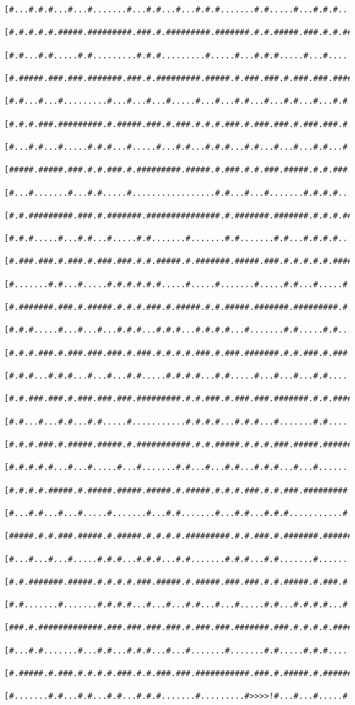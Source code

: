 \documentclass[a4paper,10pt,ngerman]{scrartcl}
\begin{document}
\begin{lstlisting}[frame=tb]
 [#...#.#.#...#...#.......#...#.#...#...#.#.#.......#.#.....#...#.#.#.........#...#]
 [#.#.#.#.#.#####.#########.###.#.#########.#######.#.#.#####.###.#.#.#######.###.#]
 [#.#...#.#.....#.#.........#.#.#.........#.....#...#.#.#.....#...#.....#.....#...#]
 [#.#####.###.###.#######.###.#.#########.#####.#.###.###.#.###.###.#####.#########]
 [#.#...#...#.........#...#...#...#.....#...#...#.#...#...#.#...#...#.#...#.......#]
 [#.#.#.###.#########.#.#####.###.#.###.#.#.#.###.#.###.###.#.###.###.#.#.#.#####.#]
 [#...#.#...#.....#.#.#...#.....#...#.#...#.#.#...#.#...#...#...#.#...#.#.#.#...#.#]
 [#####.#####.###.#.#.###.#.#########.#####.#.###.#.#.###.#####.#.#.###.###.#.#.#.#]
 [#...#.......#...#.#.....#.................#.#...#...#.......#.#.#.#...#...#.#.#.#]
 [#.#.#########.###.#.#######.###############.#.#######.#######.#.#.#.###.###.#.#.#]
 [#.#.#.....#...#.#...#.....#.#.......#.......#.#.......#.#...#.#.#.#.......#.#.#.#]
 [#.###.###.#.###.#.###.###.#.#.#####.#.#######.#####.###.#.#.#.#.#.#########.#.#.#]
 [#.......#.#...#.....#.#.#.#.#.#.....#.....#.......#.....#.#...#.....#.#.....#.#.#]
 [#.#######.###.#.#####.#.#.#.###.#.#####.#.#.#####.#######.#########.#.#.#####.#.#]
 [#.#.#.....#...#...#...#.#.#...#.#.#...#.#.#.#...#.......#.#.....#.#...#.#.......#]
 [#.#.#.###.#.###.###.###.#.###.#.#.#.#.###.#.###.#######.#.#.###.#.###.#.#########]
 [#.#.#...#.#.#...#...#...#.#.....#.#.#.#...#.#.....#...#...#...#.#.....#.....#...#]
 [#.#.###.###.#.###.###.###.#########.#.#.###.#.###.###.#######.#.#.#########.#.#.#]
 [#.#...#...#.#...#.#.....#...........#.#.#.#...#.#.#...#.......#.#.....#.....#.#.#]
 [#.#.#.###.#.#####.#####.#.###########.#.#.#####.#.#.#.###.#####.#######.#####.#.#]
 [#.#.#.#.#...#...#.....#...#.......#.#...#...#.#...#.#.#...#...#.......#.......#.#]
 [#.#.#.#.#####.#.#####.#####.#####.#.#####.#.#.#.###.#.#.###.#########.###.#####.#]
 [#...#.#...#...#.....#.......#...#.#.......#...#.#...#.#.#...........#...#.#.#...#]
 [#####.#.#.###.#####.#.#####.#.#.#.#.#########.#.#.###.#.#######.#######.#.#.#.###]
 [#...#...#...#.....#.#.#...#.#.#...#.#.......#.#.#...#.#.......#.......#.#...#...#]
 [#.#.#######.#####.#.#.#.#.###.#####.#.#####.###.###.#.#.#####.#.###.#.#.#.#####.#]
 [#.#.......#.......#.#.#.#...#...#...#.#...#...#.....#.#...#.#.#.#...#.#.#.#.....#]
 [###.#.#############.###.###.###.###.#.###.###.#######.###.#.#.#.#.#####.###.###.#]
 [#...#.#.......#...#.#...#.#.#...#...#.......#.......#.#.....#.#.#.......#...#...#]
 [#.#####.#.###.#.#.#.#.###.#.#.###.###.###########.###.#.#####.#.#########.#######]
 [#.......#.#...#.#...#.#...#.#.#.......#.........#>>>>!#...#...#.....#...........#]

\end{lstlisting}
\end{document}
